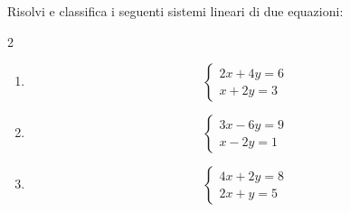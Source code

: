 \begin{question}[ID=1.5, subtitle={Sistemi lineari: casi particolari}, difficulty=difficile, tags={sistemi, equazioni lineari}]
Risolvi e classifica i seguenti sistemi lineari di due equazioni:
\begin{multicols}{2}
\begin{enumerate}[leftmargin=3.2cm]
    \item
    \[
    \begin{cases}
    2x+4y=6\\
    x+2y=3
    \end{cases}
    \]

    \item
    \[
    \begin{cases}
    3x-6y=9\\
    x-2y=1
    \end{cases}
    \]

    \item
    \[
    \begin{cases}
    4x+2y=8\\
    2x+y=5
    \end{cases}
    \]


\end{enumerate}
\end{multicols}
\end{question}

